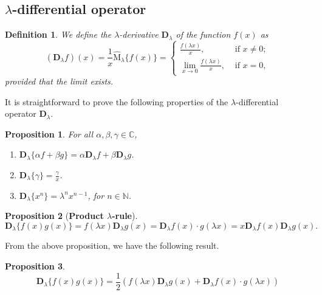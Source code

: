\documentclass[12pt]{article}
\newcommand{\C}{\mathbb{C}}
\newcommand{\N}{\mathbb{N}}
\newcommand{\M}{\widehat{\mathrm{M}}}
\newtheorem{definition}{Definition}
\newtheorem{proposition}{Proposition}
\begin{document}
\subsection{$\lambda$-differential operator}


\begin{definition}
We define the $\lambda$-derivative $\mathbf{D}_{\lambda}$ of the function $f(x)$ as
\begin{equation}
    (\mathbf{D}_{\lambda}f)(x)=\frac{1}{x}\M_{\lambda}\{f(x)\}=
    \begin{cases}
    \frac{f(\lambda x)}{x},&\text{ if }x\neq0;\\
    \lim_{x\rightarrow0}\frac{f(\lambda x)}{x},&\text{ if }x=0,
    \end{cases}
\end{equation}    
provided that the limit exists.
\end{definition}

It is straightforward to prove the following properties of the $\lambda$-differential operator $\mathbf{D}_{\lambda}$.
\begin{proposition}\label{prop_properties}
For all $\alpha,\beta,\gamma\in\C$,
\begin{enumerate}
    \item $\mathbf{D}_{\lambda}\{\alpha f+\beta g\}=\alpha\mathbf{D}_{\lambda}f+\beta\mathbf{D}_{\lambda}g$.
    \item $\mathbf{D}_{\lambda}\{\gamma\}=\frac{\gamma}{x}$.
    \item $\mathbf{D}_{\lambda}\{x^{n}\}=\lambda^{n}x^{n-1}$, for $n\in\N$.
\end{enumerate}
\end{proposition}
\begin{proposition}[{\bf Product $\lambda$-rule}]\label{prop_prod_rule}
\begin{equation}
 \mathbf{D}_{\lambda}\{f(x)g(x)\}=f(\lambda x)\mathbf{D}_{\lambda}g(x)=\mathbf{D}_{\lambda}f(x)\cdot g(\lambda x)=x\mathbf{D}_{\lambda}f(x)\mathbf{D}_{\lambda}g(x).   
\end{equation}
\end{proposition}
From the above proposition, we have the following result.
\begin{proposition}
    \begin{equation}
        \mathbf{D}_{\lambda}\{f(x)g(x)\}=\frac{1}{2}(f(\lambda x)\mathbf{D}_{\lambda}g(x)+\mathbf{D}_{\lambda}f(x)\cdot g(\lambda x))
    \end{equation}
\end{proposition}
\end{document}
